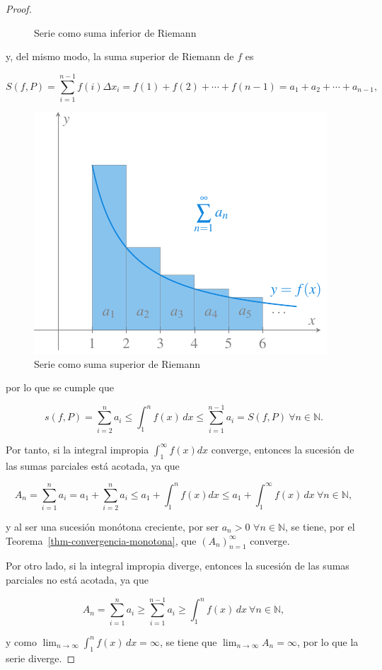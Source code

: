 \documentclass[
  a4paper,
]{scrreport}
\theoremstyle{definition}
\theoremstyle{plain}
\theoremstyle{definition}
\theoremstyle{definition}
\theoremstyle{plain}
\theoremstyle{plain}
\theoremstyle{remark}
\begin{document}
\begin{tcolorbox}
\begin{proof}
\begin{figure}[H]
{}

\caption{Serie como suma inferior de Riemann}

\end{figure}%

y, del mismo modo, la suma superior de Riemann de \(f\) es

\[
S(f,P) = \sum_{i=1}^{n-1} f(i)\Delta x_i = f(1)+f(2)+\cdots+f(n-1) = a_1+a_2+\cdots+a_{n-1},
\]

\begin{figure}[H]

{\centering \includegraphics{img/series/integral-cota-inferior-serie.pdf}

}

\caption{Serie como suma superior de Riemann}

\end{figure}%

por lo que se cumple que

\[
s(f,P)= \sum_{i=2}^n a_i \leq \int_1^n f(x)\,dx \leq \sum_{i=1}^{n-1} a_i = S(f,P) \ \forall n\in\mathbb{N}.
\]

Por tanto, si la integral impropia \(\int_1^\infty f(x)dx\) converge,
entonces la sucesión de las sumas parciales está acotada, ya que

\[
A_n = \sum_{i=1}^n a_i = a_1 + \sum_{i=2}^n a_i \leq a_1 + \int_1^n f(x)dx \leq a_1 + \int_1^\infty f(x)\,dx \ \forall n\in\mathbb{N},
\]

y al ser una sucesión monótona creciente, por ser \(a_n>0\)
\(\forall n\in \mathbb{N}\), se tiene, por el
Teorema~\ref{thm-convergencia-monotona}, que \((A_n)_{n=1}^\infty\)
converge.

Por otro lado, si la integral impropia diverge, entonces la sucesión de
las sumas parciales no está acotada, ya que

\[
A_n = \sum_{i=1}^n a_i \geq \sum_{i=1}^{n-1} a_i \geq \int_1^n f(x)\,dx\ \forall n\in\mathbb{N},
\]

y como \(\lim_{n\to\infty} \int_1^n f(x)\,dx = \infty\), se tiene que
\(\lim_{n\to\infty} A_n = \infty\), por lo que la serie diverge.
\end{proof}

\end{tcolorbox}
\end{document}
